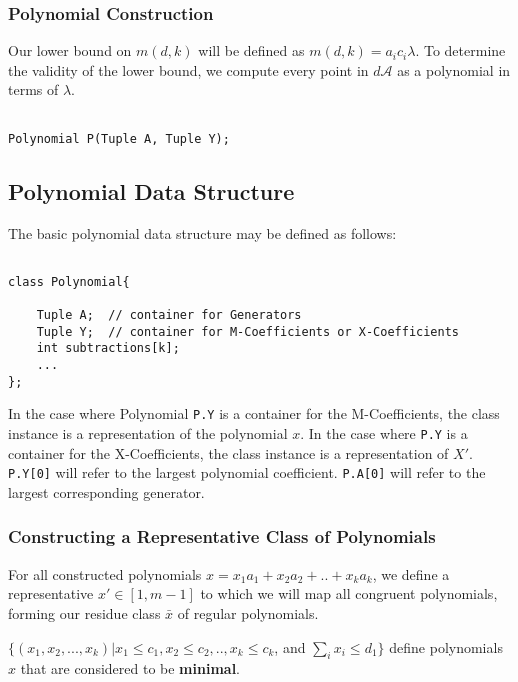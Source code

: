 \subsubsection{Polynomial Construction}

Our lower bound on $m(d, k)$ will be defined as $m(d, k) = a_{i}c_{i} \lambda$. To determine the validity of the lower bound, we compute every point in $d \mathscr{A}$ as a polynomial in terms of $\lambda$.\n

\begin{lstlisting}

Polynomial P(Tuple A, Tuple Y);

\end{lstlisting}

\subsection*{Polynomial Data Structure} The basic polynomial data structure may be defined as follows:

\begin{lstlisting}

class Polynomial{

    Tuple A;  // container for Generators
    Tuple Y;  // container for M-Coefficients or X-Coefficients
    int subtractions[k];
    ...
};

\end{lstlisting}

In the case where Polynomial \lstinline{P.Y} is a container for the M-Coefficients, the class instance is a representation of the polynomial $x$. In the case where \lstinline{P.Y} is a container for the X-Coefficients, the class instance is a representation of $X'$.
\lstinline{P.Y[0]} will refer to the largest polynomial coefficient. \lstinline{P.A[0]} will refer to the largest corresponding generator.

\subsubsection{Constructing a Representative Class of Polynomials}

For all constructed polynomials $x = x_1a_{1} + x_2a_{2} + .. + x_{k}a_{k}$, we define a representative $x' \in [1, m-1]$ to which we will map all congruent polynomials, forming our residue class $\bar{x}$ of regular polynomials.\n

\begin{proposition} 
$ \{ (x_1, x_2, ... , x_k) \vert x_{1} \leq c_1, x_{2} \leq c_2, .. , x_{k} \leq c_k$, and $\sum_{i} x_i \leq d_{1} \}$ define polynomials $x$ that are considered to be \textbf{minimal}.\n
\end{proposition}


